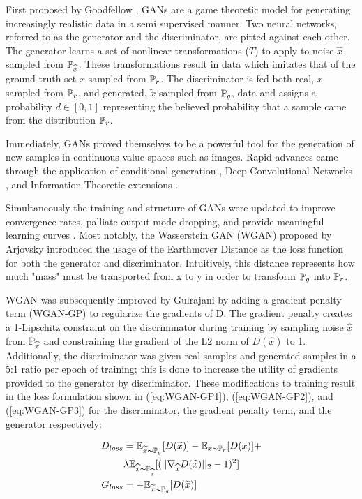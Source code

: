 First proposed by Goodfellow \etal \cite{Goodfellow2014}, GANs are a game theoretic model for generating increasingly realistic data in a semi supervised manner. Two neural networks, referred to as the generator and the discriminator, are pitted against each other. The generator learns a set of nonlinear transformations ($T$) to apply to noise $\widehat{x}$ sampled from $\P_{\widehat{x}}$. These transformations result in data which imitates that of the ground truth set $x$ sampled from $\P_r$. The discriminator is fed both real,  $x$ sampled from $\P_r$, and generated, $\widetilde{x}$ sampled from $\P_g$, data and assigns a probability $d \in [0,1]$ representing the believed probability that a sample came from the distribution $\P_r$. 

Immediately, GANs proved themselves to be a powerful tool for the generation of new samples in continuous value spaces such as images. Rapid advances came through the application of conditional generation \cite{Mirza2014}, Deep Convolutional Networks \cite{Radford2015}, and Information Theoretic extensions \cite{Chen2016}. 

Simultaneously the training and structure of GANs were updated to improve convergence rates, palliate output mode dropping, and provide meaningful learning curves \cite{Salimans, Arjovsky2017, Gulrajani2017}. Most notably, the Wasserstein GAN (WGAN) proposed by Arjovsky \etal \cite{Arjovsky2017} introduced the usage of the Earthmover Distance as the loss function for both the generator and discriminator. Intuitively, this distance represents how much "mass" must be transported from x to y in order to transform $\P_g$ into $\P_r$. 

WGAN was subsequently improved by Gulrajani \etal \cite{Gulrajani2017} by adding a gradient penalty term (WGAN-GP) to regularize the gradients of D. The gradient penalty creates a 1-Lipschitz constraint on the discriminator during training by sampling noise $\widehat{x}$ from $\P_{\widehat{x}}$ and constraining the gradient of the L2 norm of $D(\widehat{x})$ to 1. Additionally, the discriminator was given real samples and generated samples in a 5:1 ratio per epoch of training; this is done to increase the utility of gradients provided to the generator by discriminator. These modifications to training result in the loss formulation shown in (\ref{eq:WGAN-GP1}), (\ref{eq:WGAN-GP2}), and (\ref{eq:WGAN-GP3}) for the discriminator, the gradient penalty term, and the generator respectively:

\begin{align}
	D_{loss} &=  \E_{\widetilde{x} \thicksim \P_g}[D(\widetilde{x})] - \E_{x \thicksim \P_r}[D(x)] + \label{eq:WGAN-GP1} \\
	& \lambda \E_{\widehat{x} \thicksim \P_{\widehat{x}}}[(||\nabla_{\widehat{x}} D(\widehat{x})||_2 -1)^2] \label{eq:WGAN-GP2}\\
	G_{loss} &=  -\E_{\widetilde{x} \thicksim \P_g}[D(\widetilde{x})] \label{eq:WGAN-GP3}
\end{align}

